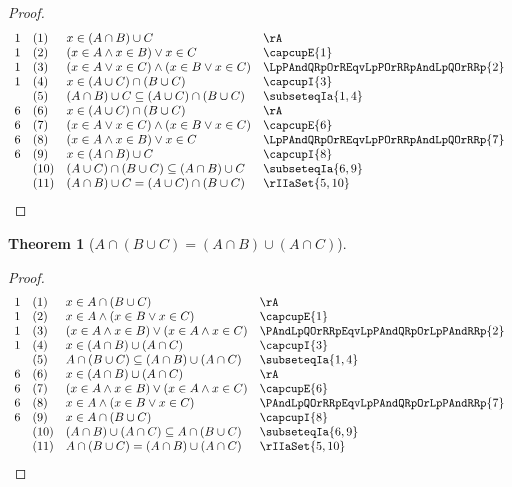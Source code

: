 \documentclass{book}
\theoremstyle{plain}
\newtheorem{theorem}{Theorem}
\theoremstyle{remark}
\theoremstyle{definition}
\begin{document}
\begin{proof}
	\[
	\begin{array}{llll}
		1 & (1) & x \in (A \cap B)\cup C & \rA \\
		1 & (2) & (x \in A\land x\in B)\lor x\in C  & \capcupE{1} \\
		1 & (3) & (x \in A\lor x \in C)\land (x\in B\lor x\in C) & \LpPAndQRpOrREqvLpPOrRRpAndLpQOrRRp{2} \\
		1 & (4) & x\in (A\cup C)\cap (B\cup C) & \capcupI{3} \\		
		& (5) & (A \cap B)\cup C\subseteq (A\cup C)\cap (B\cup C) & \subseteqIa{1,4} \\	
		6 & (6) & x\in (A\cup C)\cap (B\cup C) & \rA \\	
		6 & (7) & (x \in A\lor x \in C)\land (x\in B\lor x\in C) & \capcupE{6} \\	
		6 & (8) & (x \in A\land x\in B)\lor x\in C & \LpPAndQRpOrREqvLpPOrRRpAndLpQOrRRp{7} \\
		6 & (9) & x \in (A \cap B)\cup C & \capcupI{8} \\
		& (10) & (A\cup C)\cap (B\cup C)\subseteq (A \cap B)\cup C & \subseteqIa{6,9} \\
		& (11) & (A \cap B)\cup C = (A\cup C)\cap (B\cup C) & \rIIaSet{5,10} \\
	\end{array}
	\]
\end{proof}

\label{AcaLpBcuCRpEqualsLpAcaBRpcuLpAcaCRp}
\begin{theorem}[\(A \cap (B \cup C) = (A \cap B) \cup (A \cap C)\)]
\end{theorem}

\begin{proof}
	\[
	\begin{array}{llll}
		1 & (1) & x \in A \cap (B \cup C) & \rA \\
		1 & (2) & x \in A\land (x \in B\lor x\in C) & \capcupE{1} \\
		1 & (3) & (x \in A\land x \in B)\lor (x\in A\land x\in C) & \PAndLpQOrRRpEqvLpPAndQRpOrLpPAndRRp{2} \\
		1 & (4) & x\in (A\cap B)\cup (A\cap C) & \capcupI{3} \\		
		& (5) & A \cap (B \cup C)\subseteq (A\cap B)\cup (A\cap C) & \subseteqIa{1,4} \\	
		6 & (6) & x\in (A\cap B)\cup (A\cap C) & \rA \\	
		6 & (7) & (x \in A\land x \in B)\lor (x\in A\land x\in C) & \capcupE{6} \\	
		6 & (8) & x \in A\land (x \in B\lor x\in C) & \PAndLpQOrRRpEqvLpPAndQRpOrLpPAndRRp{7} \\
		6 & (9) & x \in A \cap (B \cup C) & \capcupI{8} \\
		& (10) & (A\cap B)\cup (A\cap C)\subseteq A \cap (B \cup C) & \subseteqIa{6,9} \\
		& (11) & A \cap (B \cup C) = (A\cap B)\cup (A\cap C) & \rIIaSet{5,10} \\
	\end{array}
	\]
\end{proof}
\end{document}
